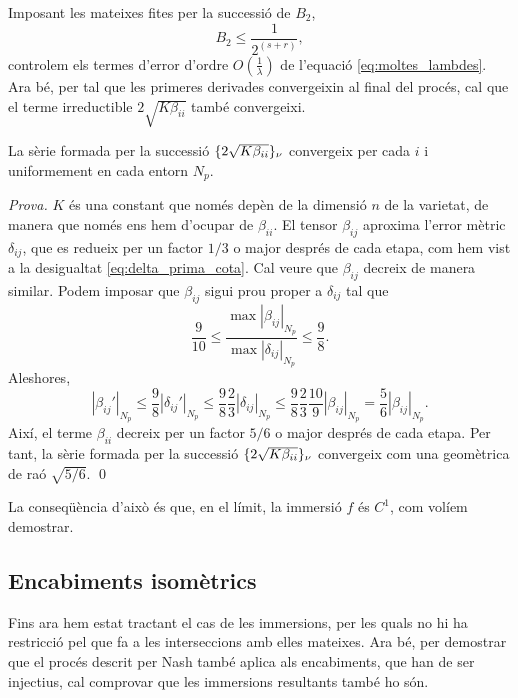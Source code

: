 Imposant les mateixes fites per la successió de $B_2$, 
\begin{equation}
    B_2 \le \frac1{2^{(s+r)}},
\end{equation}
controlem els termes d'error d'ordre $O\left(\frac1{\lambda}\right)$ de l'equació \eqref{eq:moltes_lambdes}. Ara bé, per tal que les primeres derivades convergeixin al final del procés, cal que el terme irreductible $2\sqrt{K\beta_{ii}}$ també convergeixi.

\begin{prop}
    La sèrie formada per la successió $\{2\sqrt{K\beta_{ii}}\}_{\nu}$ convergeix per cada $i$ i uniformement en cada entorn $N_p$.
\end{prop}
{
\color{black} \textit{Prova.} 
$K$ és una constant que només depèn de la dimensió $n$ de la varietat, de manera que només ens hem d'ocupar de $\beta_{ii}$.
El tensor $\beta_{ij}$ aproxima l'error mètric $\delta_{ij}$, que es redueix per un factor $1/3$ o major després de cada etapa, com hem vist a la desigualtat \eqref{eq:delta_prima_cota}. Cal veure que $\beta_{ij}$ decreix de manera similar. Podem imposar que $\beta_{ij}$ sigui prou proper a $\delta_{ij}$ tal que 
\begin{equation}
    \frac{9}{10} \le \frac{\max|\beta_{ij}|_{N_p}}{\max|\delta_{ij}|_{N_p}} \le \frac{9}{8}.
\end{equation}
Aleshores,
\begin{equation}
    |\beta_{ij}'|_{N_p} \le \frac{9}{8}|\delta_{ij}'|_{N_p}\le \frac{9}{8}\frac{2}{3}|\delta_{ij}|_{N_p} \le \frac{9}{8}\frac{2}{3}\frac{10}{9}|\beta_{ij}|_{N_p} =  \frac{5}{6}|\beta_{ij}|_{N_p}.
\end{equation}
Així, el terme $\beta_{ii}$ decreix per un factor $5/6$ o major després de cada etapa. Per tant, la sèrie formada per la successió $\{2\sqrt{K\beta_{ii}}\}_{\nu}$ convergeix com una geomètrica de raó $\sqrt{5/6}$. \qed
}

\begin{obs}
    La conseqüència d'això és que, en el límit, la immersió $f$ és $C^1$, com volíem demostrar.
\end{obs}

\subsection{Encabiments isomètrics}

Fins ara hem estat tractant el cas de les immersions, per les quals no hi ha restricció pel que fa a les interseccions amb elles mateixes. Ara bé, per demostrar que el procés descrit per Nash també aplica als encabiments, que han de ser injectius, cal comprovar que les immersions resultants també ho són.


